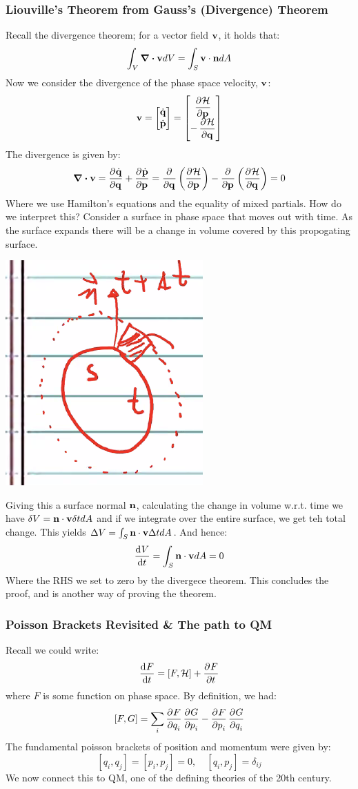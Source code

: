 \subsubsection{Liouville's Theorem from Gauss's (Divergence) Theorem}
Recall the divergence theorem; for a vector field $\mathbf{v}$, it holds that:
\[\int_V \div{\ensuremath{\mathbf{v}}} dV = \int_S \mathbf{v} \cdot \mathbf{n} dA\]
Now we consider the divergence of the phase space velocity, $\mathbf{v}$:
\[\v{v} = \m{\dot{\v{q}} \\ \dot{\v{p}}} = \m{\dpd{\HH}{\v{p}} \\ -\dpd{\HH}{\v{q}}}\]
The divergence is given by:
\[\div{\v{v}} = \dpd{\dot{\v{q}}}{\v{q}} + \dpd{\dot{\v{p}}}{\v{p}} = \dpd{}{\v{q}}\left(\dpd{\HH}{\v{p}}\right) - \dpd{}{\v{p}}\left(\dpd{\HH}{\v{q}}\right) = 0\]
Where we use Hamilton's equations and the equality of mixed partials. How do we interpret this? Consider a surface in phase space that moves out with time. As the surface expands there will be a change in volume covered by this propogating surface.
\begin{center}
    \includegraphics[scale=0.7]{Lecture-26/l26-img1.png}
\end{center}
Giving this a surface normal $\mathbf{n}$, calculating the change in volume w.r.t. time we have $\delta V = \mathbf{n}\cdot \mathbf{v}\delta t dA$ and if we integrate over the entire surface, we get teh total change. This yields $\Delta V = \int_S \mathbf{n} \cdot \mathbf{v}\Delta t dA$. And hence:
\[\dod{V}{t} = \int_S \v{n}\cdot \v{v}dA = 0\]
Where the RHS we set to zero by the divergece theorem. This concludes the proof, and is another way of proving the theorem.

\subsubsection{Poisson Brackets Revisited \& The path to QM}
Recall we could write:
\[\dod{F}{t} = [F, \HH] + \dpd{F}{t}\]
where $F$ is some function on phase space. By definition, we had:
\[[F, G] = \sum_i \dpd{F}{q_i}\dpd{G}{p_i} - \dpd{F}{p_i}\dpd{G}{q_i}\]
The fundamental poisson brackets of position and momentum were given by:
\[[q_i, q_j] = [p_i, p_j] = 0, \quad [q_i, p_j] = \delta_{ij}\]
We now connect this to QM, one of the defining theories of the 20th century. 

